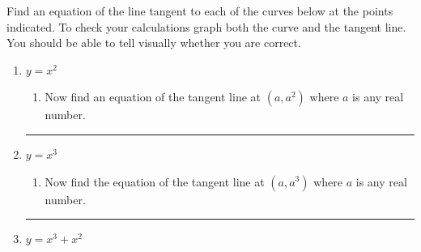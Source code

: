 \begin{ProblemSection}
  \begin{embeddedproblem}{}
    Find an equation of the line tangent to each of the curves below at
    the points indicated.   To check your calculations graph both the curve and the tangent
    line. You should be able to tell visually whether you are correct.
    \begin{enumerate}[label={\bf{}(\alph*)}]
    \item $y=x^2$
      \begin{enumerate}[label={\bf{}(\roman*)}]
      \item Now find an equation of the tangent line at $(a,a^2)$
        where $a$ is any real number.
      \end{enumerate}
      \hrule{}
    \item $y=x^3$
      \begin{enumerate}[label={\bf{}(\roman*)}]
      \item Now find the equation of the tangent line at $(a,a^3)$
        where $a$ is any real number.
      \end{enumerate}
      \hrule{}
    \item $y=x^3+x^2$
      \begin{enumerate}[label={\bf{}(\roman*)}]
\end{enumerate}
\end{enumerate}
\end{embeddedproblem}
\end{ProblemSection}
